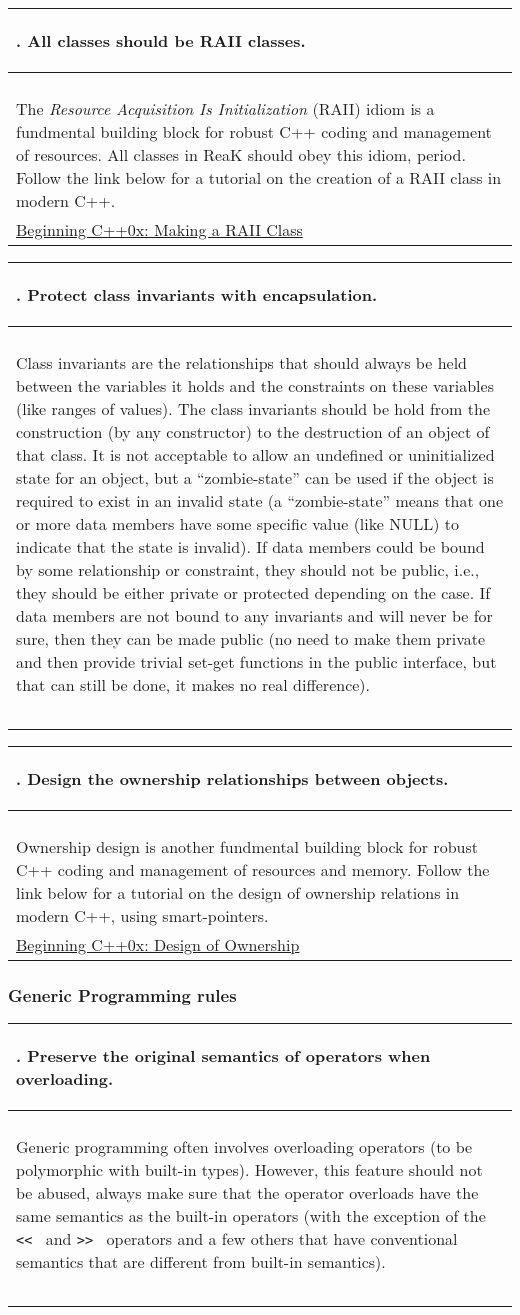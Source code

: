 \documentclass[10pt]{article}
\newcommand{\code}[1]{\color[rgb]{0.2,0.8,0.2}\texttt{#1}\color[rgb]{0,0,0} }
\newcounter {iCommandment}
\newcommand{\CorG}[5]
{
\begin{table}[H]
\begin{center}
\begin{tabular}{| p{12cm} |}
\hline
#1. #2 \\
\hline
\vspace{-0.1cm}
\parbox{12cm}{\code{#3}} \\
\vspace{-0.2cm}
#4 \\
#5 \\
\hline
\end{tabular}
\end{center}
\end{table}
}
\newcommand{\Commandment}[4]
{
\CorG{\textbf{\arabic{iCommandment}}\addtocounter{iCommandment}{1}}
{\textbf{#1}}{#2}{#3}{#4}
}
\begin{document}
\Commandment
{All classes should be RAII classes.}
{\ }
{The \textit{Resource Acquisition Is Initialization} (RAII) idiom is a fundmental building block for robust 
C++ coding and management of resources. All classes in ReaK should obey this idiom, period. Follow the link 
below for a tutorial on the creation of a RAII class in modern C++.}
{\href{http://www.daniweb.com/software-development/cpp/tutorials/373787}{Beginning C++0x: Making a RAII Class}}

\Commandment
{Protect class invariants with encapsulation.}
{\ }
{Class invariants are the relationships that should always be held between the 
variables it holds and the constraints on these variables (like ranges of values).
The class invariants should be hold from the construction (by any constructor) to 
the destruction of an object of that class. It is not acceptable to allow an undefined 
or uninitialized state for an object, but a ``zombie-state'' can be used if the object 
is required to exist in an invalid state (a ``zombie-state'' means that one or more data 
members have some specific value (like NULL) to indicate that the state is invalid).
If data members could be bound by some relationship or constraint, they should not 
be public, i.e., they should be either private or protected depending on the case. 
If data members are not bound to any invariants and will never be for sure, then 
they can be made public (no need to make them private and then provide trivial set-get
functions in the public interface, but that can still be done, it makes no real difference).
}
{\ }

\Commandment
{Design the ownership relationships between objects.}
{\ }
{Ownership design is another fundmental building block for robust 
C++ coding and management of resources and memory. Follow the link below for a tutorial on the design of 
ownership relations in modern C++, using smart-pointers.}
{\href{http://www.daniweb.com/software-development/cpp/tutorials/378692}{Beginning C++0x: Design of Ownership}}

\subsubsection{Generic Programming rules}

\Commandment
{Preserve the original semantics of operators when overloading.}
{\ }
{Generic programming often involves overloading operators (to be polymorphic with built-in types). However, 
this feature should not be abused, always make sure that the operator overloads have the same semantics as the 
built-in operators (with the exception of the \code{<<}\ and \code{>>}\ operators and a few others that have conventional semantics 
that are different from built-in semantics).}
{\ }
\end{document}
